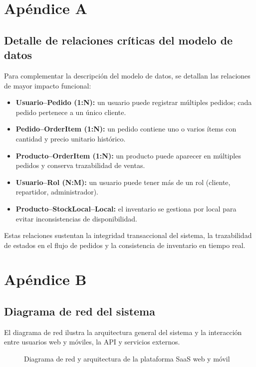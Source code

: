 \appendix
\cleardoublepage
{}

\chapter{Apéndice A}\label{ap:A}

\section*{Detalle de relaciones críticas del modelo de datos}
Para complementar la descripción del modelo de datos, se detallan las relaciones de mayor impacto funcional:
\begin{itemize}
    \item \textbf{Usuario--Pedido (1:N):} un usuario puede registrar múltiples pedidos; cada pedido pertenece a un único cliente.
    \item \textbf{Pedido--OrderItem (1:N):} un pedido contiene uno o varios ítems con cantidad y precio unitario histórico.
    \item \textbf{Producto--OrderItem (1:N):} un producto puede aparecer en múltiples pedidos y conserva trazabilidad de ventas.
    \item \textbf{Usuario--Rol (N:M):} un usuario puede tener más de un rol (cliente, repartidor, administrador).
    \item \textbf{Producto--StockLocal--Local:} el inventario se gestiona por local para evitar inconsistencias de disponibilidad.
\end{itemize}

Estas relaciones sustentan la integridad transaccional del sistema, la trazabilidad de estados en el flujo de pedidos y la consistencia de inventario en tiempo real.


\chapter{Apéndice B}\label{ap:B}

\section*{Diagrama de red del sistema}
El diagrama de red ilustra la arquitectura general del sistema y la interacción entre usuarios web y móviles, la API y servicios externos.

\begin{figure}[htbp]
    \centering
    \resizebox{0.78\textwidth}{!}{}
    \caption{Diagrama de red y arquitectura de la plataforma SaaS web y móvil}
    \label{fig:diagrama_red}
\end{figure}

